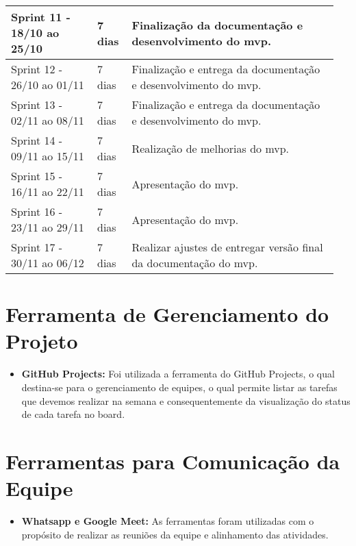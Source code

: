\begin{quadro}[H]
\begin{tabular}{|p{0.25\linewidth} | p{0.10\linewidth} | p{0.60\linewidth} |}
        \hline
        Sprint 11 - 18/10 ao 25/10 & 7 dias & Finalização da documentação e desenvolvimento do \ac{mvp}. 
        \\
        \hline
        Sprint 12 - 26/10 ao 01/11 & 7 dias & Finalização e entrega da documentação e desenvolvimento do \ac{mvp}. 
        \\
        \hline
        Sprint 13 - 02/11 ao 08/11 & 7 dias & Finalização e entrega da documentação e desenvolvimento do \ac{mvp}. 
        \\
        \hline
        Sprint 14 - 09/11 ao 15/11 & 7 dias & Realização de melhorias do \ac{mvp}. 
        \\
        \hline
        Sprint 15 - 16/11 ao 22/11 & 7 dias & Apresentação do \ac{mvp}. 
        \\
        \hline
        Sprint 16 - 23/11 ao 29/11 & 7 dias & Apresentação do \ac{mvp}. 
        \\
        \hline
        Sprint 17 - 30/11 ao 06/12 & 7 dias & Realizar ajustes de entregar versão final da documentação  do \ac{mvp}. 
        \\
        
        
        \hline
        \end{tabular}
\end{quadro}

\section{Ferramenta de Gerenciamento do Projeto}
\begin{itemize}
    \item \textbf{GitHub Projects:} Foi utilizada a ferramenta do GitHub Projects, o qual destina-se para o gerenciamento de equipes, o qual permite listar as tarefas que devemos realizar na semana e consequentemente da visualização do status de cada tarefa no \gls{board}.
\end{itemize}

\section{Ferramentas para Comunicação da Equipe}
\begin{itemize}

    \item \textbf{Whatsapp e Google Meet:} As ferramentas foram utilizadas com o propósito de realizar as reuniões da equipe e alinhamento das atividades.
\end{itemize}
